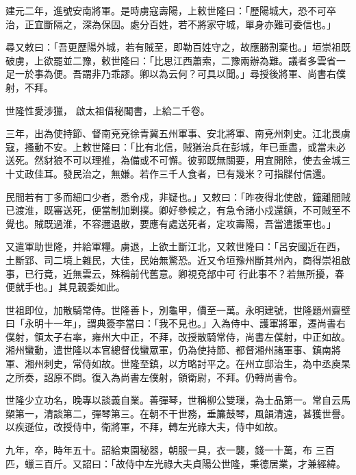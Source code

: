 \begin{pinyinscope}
 建元二年，進號安南將軍。是時虜寇壽陽，上敕世隆曰：「歷陽城大，恐不可卒治，正宜斷隔之，深為保固。處分百姓，若不將家守城，單身亦難可委信也。」



 尋又敕曰：「吾更歷陽外城，若有賊至，即勒百姓守之，故應勝割棄也。」垣崇祖既破虜，上欲罷並二豫，敕世隆曰：「比思江西蕭索，二豫兩辦為難。議者多雲省一足一於事為便。吾謂非乃乖謬。卿以為云何？可具以聞。」尋授後將軍、尚書右僕射，不拜。



 世隆性愛涉獵，
 啟太祖借秘閣書，上給二千卷。



 三年，出為使持節、督南兗兗徐青冀五州軍事、安北將軍、南兗州刺史。江北畏虜寇，搔動不安。上敕世隆曰：「比有北信，賊猶治兵在彭城，年已垂盡，或當未必送死。然豺狼不可以理推，為備或不可懈。彼郭既無關要，用宜開除，使去金城三十丈政佳耳。發民治之，無嫌。若作三千人食者，已有幾米？可指牒付信還。



 民間若有丁多而細口少者，悉令戍，非疑也。」又敕曰：「昨夜得北使啟，鐘離間賊已渡淮，既審送死，便當制加剿撲。卿好參候之，有急令諸小戍還鎮，不可賊至不覺也。賊既過淮，不容邇退散，要應有處送死者，定攻壽陽，吾當遣援軍也。」



 又遣軍助世隆，并給軍糧。虜退，上欲土斷江北，又敕世隆曰：「呂安國近在西，土斷郢、司二境上雜民，大佳，民始無驚恐。近又令垣豫州斷其州內，商得崇祖啟事，已行竟，近無雲云，殊稱前代舊意。卿視兗部中可
 行此事不？若無所擾，春便就手也。」其見親委如此。



 世祖即位，加散騎常侍。世隆善卜，別龜甲，價至一萬。永明建號，世隆題州齋壁曰「永明十一年」，謂典簽李當曰：「我不見也。」入為侍中、護軍將軍，遷尚書右僕射，領太子右率，雍州大中正，不拜，改授散騎常侍，尚書左僕射，中正如故。湘州蠻動，遣世隆以本官總督伐蠻眾軍，仍為使持節、都督湘州諸軍事、鎮南將軍、湘州刺史，常侍如故。世隆至鎮，以方略討平之。在州立邸治生，為中丞庾杲之所奏，詔原不問。復入為尚書左僕射，領衛尉，不拜。仍轉尚書令。



 世隆少立功名，晚專以談義自業。善彈琴，世稱柳公雙璅，為士品第一。常自云馬槊第一，清談第二，彈琴第三。在朝不干世務，垂簾鼓琴，風韻清遠，甚獲世譽。以疾遜位，改授侍中，衛將軍，不拜，轉左光祿大夫，侍中如故。



 九年，卒，時年五十。詔給東園秘器，朝服一具，衣一襲，錢一十萬，布
 三百匹，蠟三百斤。又詔曰：「故侍中左光祿大夫貞陽公世隆，秉德居業，才兼經緯。




\end{pinyinscope}
